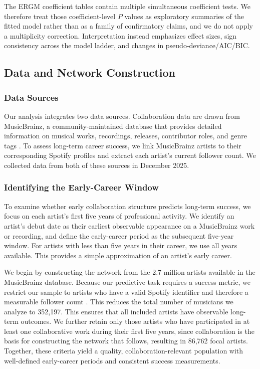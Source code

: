 \documentclass[fleqn,10pt]{wlscirep}
\begin{document}
The ERGM coefficient tables contain multiple simultaneous coefficient tests. We therefore treat those coefficient-level $P$ values as exploratory summaries of the fitted model rather than as a family of confirmatory claims, and we do not apply a multiplicity correction. Interpretation instead emphasizes effect sizes, sign consistency across the model ladder, and changes in pseudo-deviance/AIC/BIC.

\subsection*{Data and Network Construction}
\subsubsection*{Data Sources}
Our analysis integrates two data sources. Collaboration data are drawn from MusicBrainz, a community-maintained database that provides detailed information on musical works, recordings, releases, contributor roles, and genre tags \cite{MusicBrainz}. To assess long-term career success, we link MusicBrainz artists to their corresponding Spotify profiles and extract each artist’s current follower count. We collected data from both of these sources in December 2025. 

\subsubsection*{Identifying the Early-Career Window}
To examine whether early collaboration structure predicts long-term success, we focus on each artist’s first five years of professional activity. We identify an artist’s debut date as their earliest observable appearance on a MusicBrainz work or recording, and define the early-career period as the subsequent five-year window. For artists with less than five years in their career, we use all years available. This provides a simple approximation of an artist’s early career.

We begin by constructing the network from the 2.7 million artists available in the MusicBrainz database. Because our predictive task requires a success metric, we restrict our sample to artists who have a valid Spotify identifier and therefore a measurable follower count \cite{SpotifyAPI}. This reduces the total number of musicians we analyze to 352,197. This ensures that all included artists have observable long-term outcomes. We further retain only those artists who have participated in at least one collaborative work during their first five years, since collaboration is the basis for constructing the network that follows, resulting in 86,762 focal artists. Together, these criteria yield a quality, collaboration-relevant population with well-defined early-career periods and consistent success measurements.
\end{document}
